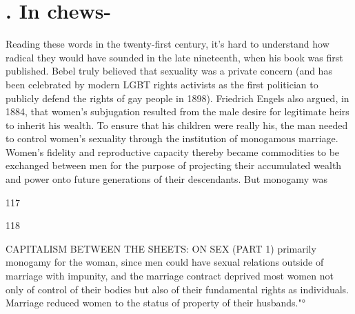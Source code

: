 \section{. In chews-}
 \par 
Reading these words in the twenty-first century, it’s hard to understand how radical they would have sounded in the late nineteenth, when his book was first published. Bebel truly believed that sexuality was a private concern (and has been celebrated by modern LGBT rights activists as the first politician to publicly defend the rights of gay people in 1898). Friedrich Engels also argued, in 1884, that women’s subjugation resulted from the male desire for legitimate heirs to inherit his wealth. To ensure that his children were really his, the man needed to control women’s sexuality through the institution of monogamous marriage. Women’s fidelity and reproductive capacity thereby became commodities to be exchanged between men for the purpose of projecting their accumulated wealth and power onto future generations of their descendants. But monogamy was
 \par 
117
 \par 
118
 \par 
CAPITALISM BETWEEN THE SHEETS: ON SEX (PART {\color{blue}1}) primarily monogamy for the woman, since men could have sexual relations outside of marriage with impunity, and the marriage contract deprived most women not only of control of their bodies but also of their fundamental rights as individuals. Marriage reduced women to the status of property of their husbands."°
 \par 
